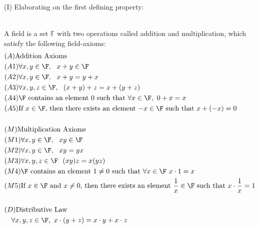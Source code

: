 \begin{description}
    \item[(I) Elaborating on the first defining property:] 
\end{description}

\begin{definition}[Field] \leavevmode \\
    A field is a set $\mathbb{F}$ with two operations called addition and multiplication, which satisfy the following field-axioms:
    \begin{align*}
        &(A) \text{Addition Axioms} \\
        &(A1) \forall x,y \in \F, ~~x+y \in \F \\
        &(A2) \forall x,y \in \F, ~~x+y = y+x \\
        &(A3) \forall x,y,z \in \F, ~~(x+y)+z = x+(y+z) \\
        &(A4) \F \text{ contains an element $0$ such that $\forall x \in \F, ~0+x = x$} \\
        &(A5) \text{If $x \in \F,$ then there exists an element $-x \in \F \st x + (-x) = 0$}
        \\ \\
        &(M) \text{Multiplication Axioms} \\
        &(M1) \forall x,y \in \F, ~~xy \in \F \\
        &(M2) \forall x,y \in \F, ~~xy = yx \\
        &(M3) \forall x,y,z \in \F ~~(xy)z = x(yz) \\
        &(M4) \F \text{ contains an element $1 \not = 0 \st \forall x \in \F ~x \cdot 1 = x$} \\
        &(M5) \text{If $x \in \F$ and $x \not = 0$, then there exists an element $\frac{1}{x} \in \F \st x \cdot \frac{1}{x} = 1$}
        \\ \\
        &(D) \text{Distributive Law} \\
        &~~~\forall x,y,z \in \F, ~x \cdot (y + z) = x \cdot y + x \cdot z
    \end{align*}
\end{definition}


